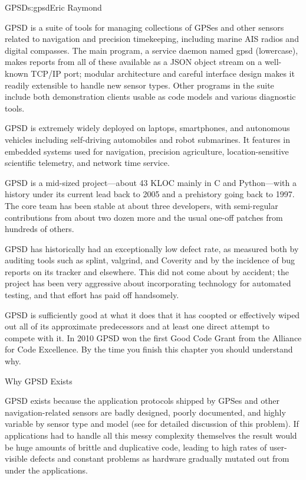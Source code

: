\begin{aosachapter}{GPSD}{s:gpsd}{Eric Raymond}

GPSD is a suite of tools for managing collections of GPSes and other
sensors related to navigation and precision timekeeping, including
marine AIS radios and digital compasses. The main program, a service
daemon named gpsd (lowercase), makes reports from all of these
available as a JSON object stream on a well-known TCP/IP port; modular
architecture and careful interface design makes it readily extensible
to handle new sensor types. Other programs in the suite include both
demonstration clients usable as code models and various diagnostic
tools.

GPSD is extremely widely deployed on laptops, smartphones, and
autonomous vehicles including self-driving automobiles and robot
submarines. It features in embedded systems used for navigation,
precision agriculture, location-sensitive scientific telemetry, and
network time service.

GPSD is a mid-sized project---about 43 KLOC mainly in C and
Python---with a history under its current lead back to 2005 and a
prehistory going back to 1997.  The core team has been stable at about
three developers, with semi-regular contributions from about two dozen
more and the usual one-off patches from hundreds of others.

GPSD has historically had an exceptionally low defect rate, as
measured both by auditing tools such as splint, valgrind, and Coverity
and by the incidence of bug reports on its tracker and elsewhere.
This did not come about by accident; the project has been very
aggressive about incorporating technology for automated testing, and
that effort has paid off handsomely.

GPSD is sufficiently good at what it does that it has coopted or
effectively wiped out all of its approximate predecessors and at least
one direct attempt to compete with it.  In 2010 GPSD won the first
Good Code Grant from the Alliance for Code Excellence.  By the time
you finish this chapter you should understand why.

\begin{aosasect1}{Why GPSD Exists}

GPSD exists because the application protocols shipped by GPSes and
other navigation-related sensors are badly designed, poorly
documented, and highly variable by sensor type and model (see
\cite{bib:gps-suck} for detailed discussion of this problem). If
applications had to handle all this messy complexity themselves the
result would be huge amounts of brittle and duplicative code, leading
to high rates of user-visible defects and constant problems as
hardware gradually mutated out from under the applications.


\end{aosasect1}
\end{aosachapter}

